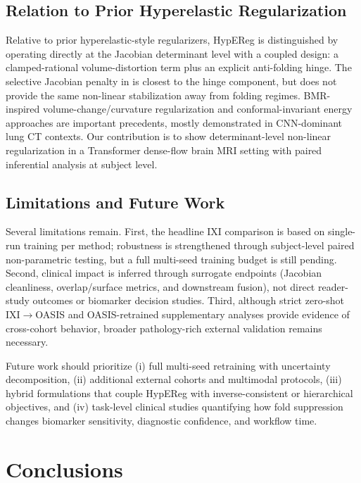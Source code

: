 \documentclass[jimaging,article,submit,pdftex,moreauthors]{Definitions/mdpi}
\begin{document}
\subsection{Relation to Prior Hyperelastic Regularization}
Relative to prior hyperelastic-style regularizers, HypEReg is distinguished by operating directly at the Jacobian determinant level with a coupled design: a clamped-rational volume-distortion term plus an explicit anti-folding hinge. The selective Jacobian penalty in \citet{mok2020fast} is closest to the hinge component, but does not provide the same non-linear stabilization away from folding regimes. BMR-inspired volume-change/curvature regularization \cite{hering2021lung} and conformal-invariant energy approaches \cite{zou2023conformal} are important precedents, mostly demonstrated in CNN-dominant lung CT contexts. Our contribution is to show determinant-level non-linear regularization in a Transformer dense-flow brain MRI setting with paired inferential analysis at subject level.

\subsection{Limitations and Future Work}
Several limitations remain. First, the headline IXI comparison is based on single-run training per method; robustness is strengthened through subject-level paired non-parametric testing, but a full multi-seed training budget is still pending. Second, clinical impact is inferred through surrogate endpoints (Jacobian cleanliness, overlap/surface metrics, and downstream fusion), not direct reader-study outcomes or biomarker decision studies. Third, although strict zero-shot IXI\(\to\)OASIS and OASIS-retrained supplementary analyses provide evidence of cross-cohort behavior, broader pathology-rich external validation remains necessary.

Future work should prioritize (i) full multi-seed retraining with uncertainty decomposition, (ii) additional external cohorts and multimodal protocols, (iii) hybrid formulations that couple HypEReg with inverse-consistent or hierarchical objectives, and (iv) task-level clinical studies quantifying how fold suppression changes biomarker sensitivity, diagnostic confidence, and workflow time.

\section{Conclusions}\label{sec:conclusion}
\end{document}
